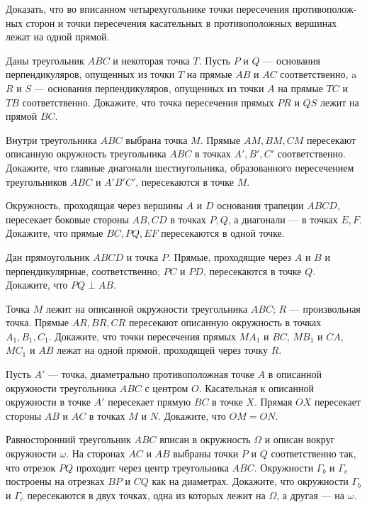 \documentclass{article}
\begin{document}
	\begin{enumerate_boxed}
		
		\item Доказать, что во вписанном четырехугольнике точки пересечения противополож- ных сторон и точки пересечения касательных в противоположных вершинах лежат на одной прямой.
		
		\item Даны треугольник $ABC$ и некоторая точка $T$.
		Пусть $P$ и $Q$ — основания перпендикуляров, опущенных из точки $T$ на прямые $AB$ и $AC$ соответственно, a $R$ и $S$ — основания перпендикуляров, опущенных из точки $A$ на прямые $TC$ и $TB$ соответственно.
		Докажите, что точка пересечения прямых $PR$ и $QS$ лежит на прямой $BC$.
		
		\item Внутри треугольника $ABC$ выбрана точка $M$.
		Прямые $AM, BM, CM$ пересекают описанную окружность треугольника $ABC$ в точках $A', B', C'$ соответственно.
		Докажите, что главные диагонали шестиугольника, образованного пересечением треугольников $ABC$ и $A'B'C'$, пересекаются в точке $M$.
		
		\item Окружность, проходящая через вершины $A$ и $D$ основания трапеции $ABCD$, пересекает боковые стороны $AB, CD$ в точках $P, Q$, а диагонали — в точках $E, F$.
		Докажите, что прямые $BC, PQ, EF$ пересекаются в одной точке.
		
		\item Дан прямоугольник $ABCD$ и точка $P$.
		Прямые, проходящие через $A$ и $B$ и перпендикулярные, соответственно, $PC$ и $PD$, пересекаются в точке $Q$.
		Докажите, что $PQ \perp AB$.
		
		\item Точка $M$ лежит на описанной окружности треугольника $ABC$; $R$ — произвольная точка.
		Прямые $AR, BR, CR$ пересекают описанную окружность в точках $A_1, B_1, C_1$.
		Докажите, что точки пересечения прямых $MA_1$ и $BC$, $MB_1$ и $CA$, $MC_1$ и $AB$ лежат на одной прямой, проходящей через точку $R$.
		
		\item Пусть $A'$ — точка, диаметрально противоположная точке $A$ в описанной окружности треугольника $ABC$ с центром $O$.
		Касательная к описанной окружности в точке $A'$ пересекает прямую $BC$ в точке $X$.
		Прямая $OX$ пересекает стороны $AB$ и $AC$ в точках $M$ и $N$.
		Докажите, что $OM = ON$.
		
		\item Равносторонний треугольник $ABC$ вписан в окружность $\Omega$ и описан вокруг окружности $\omega$.
		На сторонах $AC$ и $AB$ выбраны точки $P$ и $Q$ соответственно так, что отрезок $PQ$ проходит через центр треугольника $ABC$.
		Окружности $\Gamma_b$ и $\Gamma_c$ построены на отрезках $BP$ и $CQ$ как на диаметрах.
		Докажите, что окружности $\Gamma_b$ и $\Gamma_c$ пересекаются в двух точках, одна из которых лежит на $\Omega$, а другая --- на $\omega$.
		

\end{enumerate_boxed}
\end{document}
